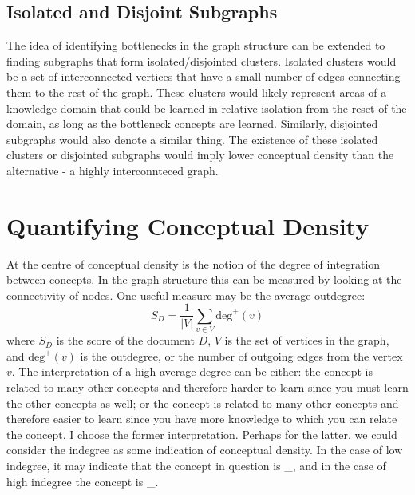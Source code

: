 \documentclass[12pt]{article}
\begin{document}
\subsection{Isolated and Disjoint Subgraphs} 
The idea of identifying bottlenecks in the graph structure can be extended to finding subgraphs that form isolated/disjointed clusters. Isolated clusters would be a set of interconnected vertices that have a small number of edges connecting them to the rest of the graph. These clusters would likely represent areas of a knowledge domain that could be learned in relative isolation from the reset of the domain, as long as the bottleneck concepts are learned. Similarly, disjointed subgraphs would also denote a similar thing. The existence of these isolated clusters or disjointed subgraphs would imply lower conceptual density than the alternative - a highly interconnteced graph.

\section{Quantifying Conceptual Density} \label{sec:quantifying_conceptual_density}
At the centre of conceptual density is the notion of the degree of integration between concepts. In the graph structure this can be measured by looking at the connectivity of nodes. One useful measure may be the average outdegree:
\begin{equation} \label{eq:simple score}
    S_D = \frac{1}{|V|} \sum_{v \in V} \text{deg}^+(v)
\end{equation}
where $S_D$ is the score of the document $D$, $V$ is the set of vertices in the graph,  and $\text{deg}^+(v)$ is the outdegree, or the number of outgoing edges from the vertex $v$. The interpretation of a high average degree can be either: the concept is related to many other concepts and therefore harder to learn since you must learn the other concepts as well; or the concept is related to many other concepts and therefore easier to learn since you have more knowledge to which you can relate the concept. I choose the former interpretation. Perhaps for the latter, we could consider the indegree as some indication of conceptual density. In the case of low indegree, it may indicate that the concept in question is \_, and in the case of high indegree the concept is \_.
\end{document}
